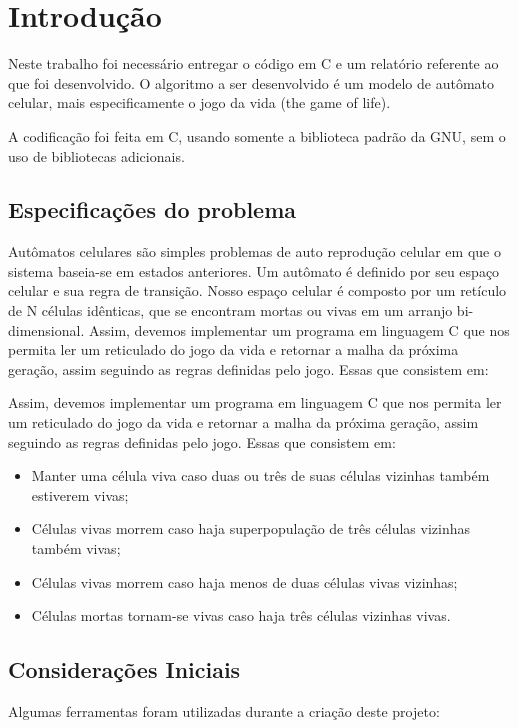 \documentclass{article}
\begin{document}



\section{Introdução}

Neste trabalho foi necessário entregar o código em C e um relatório referente ao que foi desenvolvido. O algoritmo a ser desenvolvido é um modelo de autômato celular, mais especificamente o jogo da vida (the game of life).

A codificação foi feita em C, usando somente a biblioteca padrão da GNU, sem o uso de bibliotecas adicionais.


\subsection{Especificações do problema}

Autômatos celulares são simples problemas de auto reprodução celular em que o sistema baseia-se em estados anteriores.  Um autômato é definido por seu espaço celular e sua regra de transição. Nosso espaço celular é composto por um retículo de N células idênticas, que se encontram mortas ou vivas em um arranjo bi-dimensional. Assim, devemos implementar um programa em linguagem C que nos permita ler um reticulado do jogo da vida e retornar a malha da próxima geração, assim seguindo as regras definidas pelo jogo. Essas que consistem em:

Assim, devemos implementar um programa em linguagem C que nos permita ler um reticulado do jogo da vida e retornar a malha da próxima geração, assim seguindo as regras definidas pelo jogo. Essas que consistem em:

\begin{itemize}
    \item Manter uma célula viva caso duas ou três de suas células vizinhas também estiverem vivas;
    \item Células vivas morrem caso haja superpopulação de três células vizinhas também vivas;
    \item Células vivas morrem caso haja menos de duas células vivas vizinhas;
    \item Células mortas tornam-se vivas caso haja três células vizinhas vivas.
\end{itemize}

\subsection{Considerações Iniciais}
Algumas ferramentas foram utilizadas durante a criação deste projeto:
\end{document}
